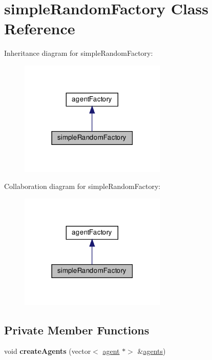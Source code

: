 \hypertarget{classsimpleRandomFactory}{}\section{simple\+Random\+Factory Class Reference}
\label{classsimpleRandomFactory}


Inheritance diagram for simple\+Random\+Factory\+:
\nopagebreak
\begin{figure}[H]
\begin{center}
\leavevmode
\includegraphics[width=198pt]{classsimpleRandomFactory__inherit__graph}
\end{center}
\end{figure}


Collaboration diagram for simple\+Random\+Factory\+:
\nopagebreak
\begin{figure}[H]
\begin{center}
\leavevmode
\includegraphics[width=198pt]{classsimpleRandomFactory__coll__graph}
\end{center}
\end{figure}
\subsection*{Private Member Functions}
\begin{DoxyCompactItemize}
\item 
\mbox{\label{classsimpleRandomFactory_ac781683a570893f0fffef73f0d253aac}} 
void {\bfseries create\+Agents} (vector$<$ \mbox{\hyperlink{classagent}{agent}} $\ast$$>$ \&\mbox{\hyperlink{classagents}{agents}})
\end{DoxyCompactItemize}
